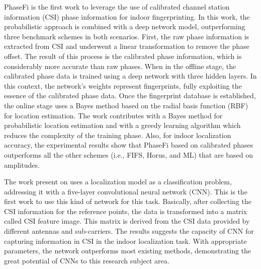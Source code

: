     PhaseFi \cite{Wang2016} is the first work to leverage the use of calibrated channel station information (CSI) phase information for indoor fingerprinting. In this work, the probabilistic approach is combined with a deep network model, outperforming three benchmark schemes in both scenarios.
    First, the raw phase information is extracted from CSI and underwent a linear transformation to remove the phase offset. The result of this process is the calibrated phase information, which is considerably more accurate than raw phases. When in the offline stage, the calibrated phase data is trained using a deep network with three hidden layers. In this context, the network's weights represent fingerprints, fully exploiting the essence of the calibrated phase data. Once the fingerprint database is established, the online stage uses a Bayes method based on the radial basis function (RBF) for location estimation.
    The work contributes with a Bayes method for probabilistic location estimation and with a greedy learning algorithm which reduces the complexity of the training phase. Also, for indoor localization accuracy, the experimental results show that PhaseFi based on calibrated phases outperforms all the other schemes (i.e., FIFS, Horus, and ML) \cite{horus, fifs, brunato2005statistical} that are based on amplitudes.
    
    The work present on \cite{Chen2017} uses a localization model as a classification problem, addressing it with a five-layer convolutional neural network (CNN). This is the first work to use this kind of network for this task.
    Basically, after collecting the CSI information for the reference points, the data is transformed into a matrix called CSI feature image. This matrix is derived from the CSI data provided by different antennas and sub-carriers.
    The results suggests the capacity of CNN for capturing information in CSI in the indoor localization task. With appropriate parameters, the network outperforms most existing methods, demonstrating the great potential of CNNs to this research subject area.
    
